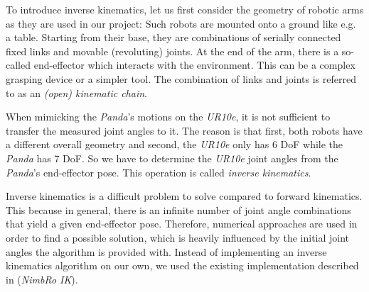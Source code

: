\documentclass[runningheads]{llncs}
\begin{document}
To introduce inverse kinematics, let us first consider the geometry of robotic arms as they are used in our project: Such robots are mounted onto a ground like e.g. a table. Starting from their base, they are combinations of serially connected fixed links and movable (revoluting) joints. At the end of the arm, there is a so-called end-effector which interacts with the environment. This can be a complex grasping device or a simpler tool. The combination of links and joints is referred to as an \textit{(open) kinematic chain}.




When mimicking the \textit{Panda}'s motions on the \textit{UR10e}, it is not sufficient to transfer the measured joint angles to it. The reason is that first, both robots have a different overall geometry and second, the \textit{UR10e} only has 6 DoF while the \textit{Panda} has 7 DoF. So we have to determine the \textit{UR10e} joint angles from the \textit{Panda}'s end-effector pose. This operation is called \textit{inverse kinematics}.


Inverse kinematics is a difficult problem to solve compared to forward kinematics. This because in general, there is an infinite number of joint angle combinations that yield a given end-effector pose. Therefore, numerical approaches are used in order to find a possible solution, which is heavily influenced by the initial joint angles the algorithm is provided with.
Instead of implementing an inverse kinematics algorithm on our own, we used the existing implementation described in \cite{schwarz2017nimbro} (\textit{NimbRo IK}).
\end{document}
